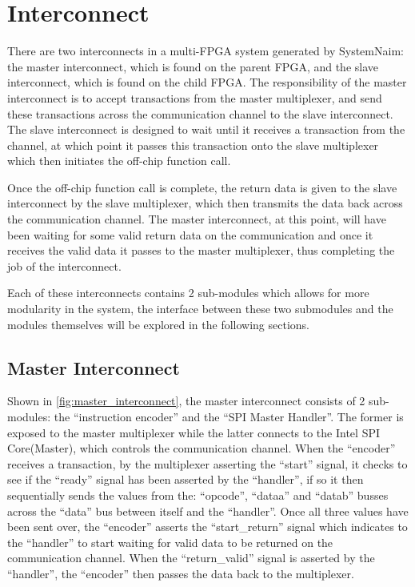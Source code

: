     

\section{Interconnect}
\label{sec:impl_interconnect}

There are two interconnects in a multi-FPGA system generated by SystemNaim: the master interconnect, which is found on the parent FPGA, and the slave interconnect, which is found on the child FPGA. The responsibility of the master interconnect is to accept transactions from the master multiplexer, and send these transactions across the communication channel to the slave interconnect. The slave interconnect is designed to wait until it receives a transaction from the channel, at which point it passes this transaction onto the slave multiplexer which then initiates the off-chip function call.

Once the off-chip function call is complete, the return data is given to the slave interconnect by the slave multiplexer, which then transmits the data back across the communication channel. The master interconnect, at this point, will have been waiting for some valid return data on the communication and once it receives the valid data it passes to the master multiplexer, thus completing the job of the interconnect.

Each of these interconnects contains 2 sub-modules which allows for more modularity in the system, the interface between these two submodules and the modules themselves will be explored in the following sections.

\subsection{Master Interconnect}

Shown in \autoref{fig:master_interconnect}, the master interconnect consists of 2 sub-modules: the “instruction encoder” and the “SPI Master Handler”. The former is exposed to the master multiplexer while the latter connects to the Intel SPI Core(Master), which controls the communication channel. When the “encoder” receives a transaction, by the multiplexer asserting the “start” signal, it checks to see if the “ready” signal has been asserted by the “handler”, if so it then sequentially sends the values from the: “opcode”, “dataa” and “datab” busses across the “data” bus between itself and the “handler”. Once all three values have been sent over, the “encoder” asserts the “start\_return” signal which indicates to the “handler” to start waiting for valid data to be returned on the communication channel. When the “return\_valid” signal is asserted by the “handler”, the “encoder” then passes the data back to the multiplexer.

